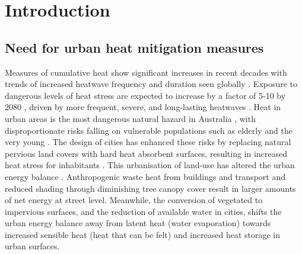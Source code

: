 \documentclass[final,3p,times,authoryear]{elsarticle}
\begin{document}
\maketitle

\section{Introduction}

\subsection{Need for urban heat mitigation measures}

Measures of cumulative heat show significant increases in recent decades with trends of increased heatwave frequency and duration seen globally \citep{Perkins-Kirkpatrick2020}. Exposure to dangerous levels of heat stress are expected to increase by a factor of 5-10 by 2080 \citep{Coffel2018}, driven by more frequent, severe, and long-lasting heatwaves \citep{IPCC2013a}. Heat in urban areas is the most dangerous natural hazard in Australia \citep{Coates2014}, with disproportionate risks falling on vulnerable populations such as elderly and the very young \citep{Nicholls2008}. The design of cities has enhanced these risks by replacing natural pervious land covers with hard heat absorbent surfaces, resulting in increased heat stress for inhabitants \citep{Coutts2012,Martilli2020}. This urbanisation of land-use has altered the urban energy balance \citep{Oke1982}. Anthropogenic waste heat from buildings and transport and reduced shading through diminishing tree canopy cover result in larger amounts of net energy at street level. Meanwhile, the conversion of vegetated to impervious surfaces, and the reduction of available water in cities, shifts the urban energy balance away from latent heat (water evaporation) towards increased sensible heat (heat that can be felt) and increased heat storage in urban surfaces. 
\end{document}
